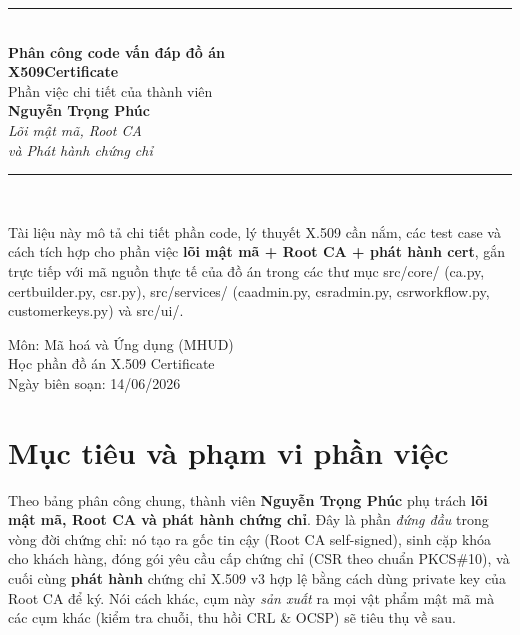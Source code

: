 \documentclass[12pt,a4paper]{article}
\newcommand{\code}[1]{{\ttfamily\small\def\_{\textunderscore\discretionary{}{}{}}#1}}
\begin{document}
\begin{titlepage}
\centering
\vspace*{2.2cm}
{\color{accent}\rule{\linewidth}{1.2pt}}\\[0.6cm]
{\Huge\bfseries Phân công code vấn đáp đồ án}\\[0.35cm]
{\Huge\bfseries\color{accent} X509Certificate}\\[0.5cm]
{\Large Phần việc chi tiết của thành viên}\\[0.3cm]
{\LARGE\bfseries Nguyễn Trọng Phúc}\\[0.45cm]
{\large\itshape Lõi mật mã, Root CA\\ và Phát hành chứng chỉ}\\[0.5cm]
{\color{accent}\rule{\linewidth}{1.2pt}}\\[1.4cm]

\begin{minipage}{0.85\linewidth}
\centering\small
Tài liệu này mô tả chi tiết phần code, lý thuyết X.509 cần nắm, các test case
và cách tích hợp cho phần việc \textbf{lõi mật mã + Root CA + phát hành cert},
gắn trực tiếp với mã nguồn thực tế của đồ án trong các thư mục
\code{src/core/} (\code{ca.py}, \code{cert\_builder.py}, \code{csr.py}),
\code{src/services/} (\code{ca\_admin.py}, \code{csr\_admin.py},
\code{csr\_workflow.py}, \code{customer\_keys.py}) và \code{src/ui/}.
\end{minipage}

\vfill
{\large Môn: Mã hoá và Ứng dụng (MHUD)}\\[0.2cm]
{\large Học phần đồ án X.509 Certificate}\\[0.6cm]
{\small Ngày biên soạn: 14/06/2026}
\end{titlepage}

\tableofcontents
\thispagestyle{fancy}
\clearpage

\section{Mục tiêu và phạm vi phần việc}

Theo bảng phân công chung, thành viên \textbf{Nguyễn Trọng Phúc} phụ trách
\textbf{lõi mật mã, Root CA và phát hành chứng chỉ}. Đây là phần \emph{đứng đầu}
trong vòng đời chứng chỉ: nó tạo ra gốc tin cậy (Root CA self-signed), sinh cặp
khóa cho khách hàng, đóng gói yêu cầu cấp chứng chỉ (CSR theo chuẩn PKCS\#10),
và cuối cùng \textbf{phát hành} chứng chỉ X.509 v3 hợp lệ bằng cách dùng private
key của Root CA để ký. Nói cách khác, cụm này \emph{sản xuất} ra mọi vật phẩm
mật mã mà các cụm khác (kiểm tra chuỗi, thu hồi CRL \& OCSP) sẽ tiêu thụ về sau.
\end{document}
